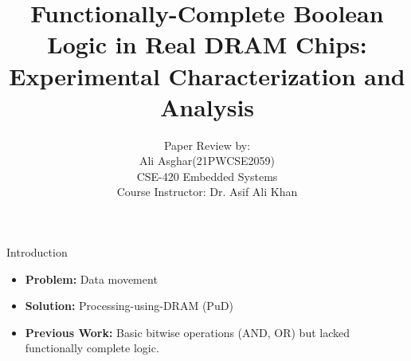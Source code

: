 \documentclass{beamer}
\title{Functionally-Complete Boolean Logic in Real DRAM Chips:
Experimental Characterization and Analysis}
\subtitle{%
Paper Review by: \\%
Ali Asghar(21PWCSE2059) \\[1em]%
CSE-420 Embedded Systems \\
Course Instructor: Dr. Asif Ali Khan \\%
}
\date{}
\begin{document}
\maketitle
{} %




\begin{frame}[t]{Introduction}
	\begin{itemize}
			\item \textbf{Problem:} Data movement
			\item \textbf{Solution:} Processing-using-DRAM (PuD) 
			\item \textbf{Previous Work:} Basic bitwise operations (AND, OR) but lacked functionally complete logic.
	\end{itemize}
\end{frame}


\end{document}
